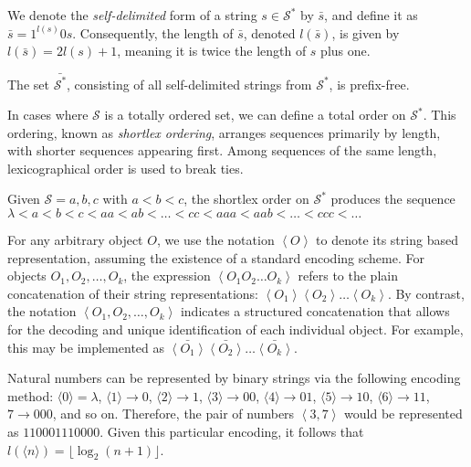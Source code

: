We denote the \emph{self-delimited} form of a string $s \in \mathcal{S}^{\ast}$ by $\bar{s}$, and define it as $\bar{s} = 1^{l(s)}0s$. Consequently, the length of $\bar{s}$, denoted $l(\bar{s})$, is given by $l(\bar{s}) = 2l(s) + 1$, meaning it is twice the length of $s$ plus one.

\begin{example}
The set $\bar{\mathcal{S}^{\ast}}$, consisting of all self-delimited strings from $\mathcal{S}^{\ast}$, is prefix-free.
\end{example}

In cases where $\mathcal{S}$ is a totally ordered set, we can define a total order on $\mathcal{S}^{\ast}$. This ordering, known as \emph{shortlex ordering}, arranges sequences primarily by length, with shorter sequences appearing first. Among sequences of the same length, lexicographical order is used to break ties.

\begin{example}
Given $\mathcal{S} = {a, b, c}$ with $a < b < c$, the shortlex order on $\mathcal{S}^{\ast}$ produces the sequence $\lambda < a < b < c < aa < ab < \ldots < cc < aaa < aab < \ldots < ccc < \ldots$
\end{example}

For any arbitrary object $O$, we use the notation $\left\langle O \right\rangle$ to denote its string based representation, assuming the existence of a standard encoding scheme. For objects $O_{1}, O_{2}, \ldots, O_{k}$, the expression $\left\langle O_1 O_2 \ldots O_k \right\rangle$ refers to the plain concatenation of their string representations: $\left\langle O_1 \right\rangle \left\langle O_2 \right\rangle \ldots \left\langle O_k \right\rangle$. By contrast, the notation $\left\langle O_1, O_2, \ldots, O_k \right\rangle$ indicates a structured concatenation that allows for the decoding and unique identification of each individual object. For example, this may be implemented as $\bar{\left\langle O_1 \right\rangle} \bar{\left\langle O_2 \right\rangle} \ldots \bar{\left\langle O_k \right\rangle}$.

\begin{example}
Natural numbers can be represented by binary strings via the following encoding method: $\langle 0 \rangle = \lambda$, $\langle 1 \rangle \rightarrow 0$, $\langle 2 \rangle \rightarrow 1$, $\langle 3 \rangle \rightarrow 00$, $\langle 4 \rangle \rightarrow 01$, $\langle 5 \rangle \rightarrow 10$, $\langle 6 \rangle \rightarrow 11$, $7 \rightarrow 000$, and so on. Therefore, the pair of numbers $\left\langle 3, 7 \right\rangle$ would be represented as $110001110000$. Given this particular encoding, it follows that $l \left( \langle n \rangle \right) = \lfloor \log_2 (n + 1) \rfloor$.
\end{example}

